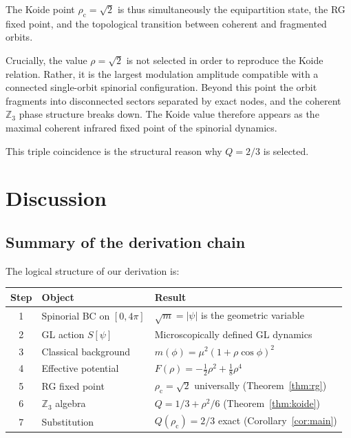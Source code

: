\documentclass[12pt,a4paper]{article}
\theoremstyle{definition}
\newcommand{\rhoc}{\rho_{\mathrm{c}}}
\begin{document}
The Koide point $\rhoc = \sqrt{2}$ is thus simultaneously the equipartition state,
the RG fixed point, and the topological transition between coherent and fragmented
orbits.

Crucially, the value $\rho=\sqrt2$ is not selected in order to reproduce
the Koide relation.
Rather, it is the largest modulation amplitude compatible with a connected
single-orbit spinorial configuration.
Beyond this point the orbit fragments into disconnected sectors separated
by exact nodes, and the coherent $\mathbb{Z}_3$ phase structure breaks down.
The Koide value therefore appears as the maximal coherent infrared fixed point
of the spinorial dynamics.

This triple coincidence is the structural reason why $Q = 2/3$ is selected.


\section{Discussion}
\label{sec:discussion}

\subsection{Summary of the derivation chain}

The logical structure of our derivation is:

\medskip
\begin{center}
\renewcommand{\arraystretch}{1.4}
\begin{tabular}{cll}
  \toprule
  Step & Object & Result \\
  \midrule
  1 & Spinorial BC on $[0,4\pi]$ & $\sqrt{m} = |\psi|$ is the geometric variable \\
  2 & GL action $S[\psi]$        & Microscopically defined GL dynamics \\
  3 & Classical background       & $m(\phi) = \mu^2(1+\rho\cos\phi)^2$ \\
  4 & Effective potential         & $F(\rho) = -\tfrac{1}{2}\rho^2 + \tfrac{1}{8}\rho^4$ \\
  5 & RG fixed point             & $\rhoc = \sqrt{2}$ universally (Theorem~\ref{thm:rg}) \\
  6 & $\mathbb{Z}_3$ algebra     & $Q = 1/3 + \rho^2/6$ (Theorem~\ref{thm:koide}) \\
  7 & Substitution               & $Q(\rhoc) = 2/3$ exact (Corollary~\ref{cor:main}) \\
  \bottomrule
\end{tabular}
\end{center}
\medskip
\end{document}
